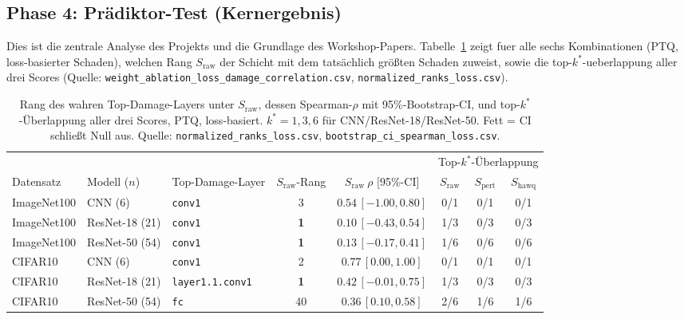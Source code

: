 \subsection{Phase 4: Prädiktor-Test (Kernergebnis)}
\label{sec:phase4}

Dies ist die zentrale Analyse des Projekts und die Grundlage des Workshop-Papers. Tabelle~\ref{tab:rank} zeigt fuer alle sechs Kombinationen (PTQ, loss-basierter Schaden), welchen Rang $S_{\mathrm{raw}}$ der Schicht mit dem tatsächlich größten Schaden zuweist, sowie die top-$k^*$-ueberlappung aller drei Scores (Quelle: \texttt{weight\_ablation\_loss\_damage\_correlation.csv}, \texttt{normalized\_ranks\_loss.csv}).

\begin{table}[t]
\centering
\small
\setlength{\tabcolsep}{3.5pt}
\caption{Rang des wahren Top-Damage-Layers unter $S_{\mathrm{raw}}$, dessen Spearman-$\rho$ mit 95\%-Bootstrap-CI, und top-$k^*$-Überlappung aller drei Scores, PTQ, loss-basiert. $k^*=1,3,6$ für CNN/ResNet-18/ResNet-50. Fett = CI schließt Null aus. Quelle: \texttt{normalized\_ranks\_loss.csv}, \texttt{bootstrap\_ci\_spearman\_loss.csv}.}
\label{tab:rank}
\begin{tabularx}{\textwidth}{@{} ll l c c ccc @{}}
\toprule
& & & & & \multicolumn{3}{c}{Top-$k^*$-Überlappung} \\
\cmidrule(lr){6-8}
Datensatz & Modell ($n$) & Top-Damage-Layer & $S_{\mathrm{raw}}$-Rang & $S_{\mathrm{raw}}\ \rho$ [95\%-CI] & $S_{\mathrm{raw}}$ & $S_{\mathrm{pert}}$ & $S_{\mathrm{hawq}}$ \\
\midrule
ImageNet100 & CNN (6)        & \texttt{conv1}          & 3          & $0.54\,[-1.00,0.80]$         & 0/1 & 0/1 & 0/1 \\
ImageNet100 & ResNet-18 (21) & \texttt{conv1}          & \textbf{1} & $0.10\,[-0.43,0.54]$         & 1/3 & 0/3 & 0/3 \\
ImageNet100 & ResNet-50 (54) & \texttt{conv1}          & \textbf{1} & $0.13\,[-0.17,0.41]$         & 1/6 & 0/6 & 0/6 \\
CIFAR10     & CNN (6)        & \texttt{conv1}          & 2          & $0.77\,[0.00,1.00]$          & 0/1 & 0/1 & 0/1 \\
CIFAR10     & ResNet-18 (21) & \texttt{layer1.1.conv1} & \textbf{1} & $0.42\,[-0.01,0.75]$         & 1/3 & 0/3 & 0/3 \\
CIFAR10     & ResNet-50 (54) & \texttt{fc}             & 40         & $\mathbf{0.36\,[0.10,0.58]}$ & 2/6 & 1/6 & 1/6 \\
\bottomrule
\end{tabularx}
\end{table}

